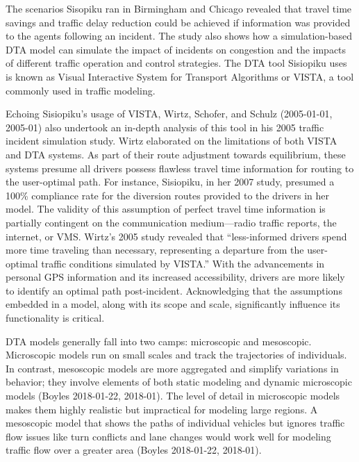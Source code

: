 \documentclass[
  letterpaper,
  DIV=11,
  numbers=noendperiod]{scrreprt}
\begin{document}
The scenarios Sisopiku ran in Birmingham and Chicago revealed that
travel time savings and traffic delay reduction could be achieved if
information was provided to the agents following an incident. The study
also shows how a simulation-based DTA model can simulate the impact of
incidents on congestion and the impacts of different traffic operation
and control strategies. The DTA tool Sisiopiku uses is known as Visual
Interactive System for Transport Algorithms or VISTA, a tool commonly
used in traffic modeling.

Echoing Sisiopiku's usage of VISTA, Wirtz, Schofer, and Schulz
(2005-01-01, 2005-01) also undertook an in-depth analysis of this tool
in his 2005 traffic incident simulation study. Wirtz elaborated on the
limitations of both VISTA and DTA systems. As part of their route
adjustment towards equilibrium, these systems presume all drivers
possess flawless travel time information for routing to the user-optimal
path. For instance, Sisiopiku, in her 2007 study, presumed a 100\%
compliance rate for the diversion routes provided to the drivers in her
model. The validity of this assumption of perfect travel time
information is partially contingent on the communication medium---radio
traffic reports, the internet, or VMS. Wirtz's 2005 study revealed that
``less-informed drivers spend more time traveling than necessary,
representing a departure from the user-optimal traffic conditions
simulated by VISTA.'' With the advancements in personal GPS information
and its increased accessibility, drivers are more likely to identify an
optimal path post-incident. Acknowledging that the assumptions embedded
in a model, along with its scope and scale, significantly influence its
functionality is critical.

DTA models generally fall into two camps: microscopic and mesoscopic.
Microscopic models run on small scales and track the trajectories of
individuals. In contrast, mesoscopic models are more aggregated and
simplify variations in behavior; they involve elements of both static
modeling and dynamic microscopic models (Boyles 2018-01-22, 2018-01).
The level of detail in microscopic models makes them highly realistic
but impractical for modeling large regions. A mesoscopic model that
shows the paths of individual vehicles but ignores traffic flow issues
like turn conflicts and lane changes would work well for modeling
traffic flow over a greater area (Boyles 2018-01-22, 2018-01).
\end{document}
